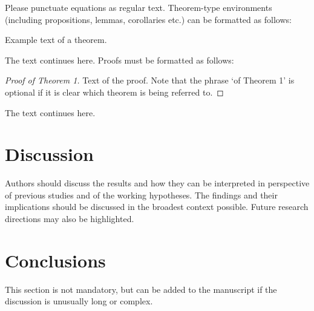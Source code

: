 \documentclass[bioengineering,article,submit,moreauthors,pdftex,10pt,a4paper]{mdpi}
\begin{document}
Please punctuate equations as regular text. Theorem-type environments (including propositions, lemmas, corollaries etc.) can be formatted as follows:
\begin{Theorem}
Example text of a theorem.
\end{Theorem}

The text continues here. Proofs must be formatted as follows:

\begin{proof}[Proof of Theorem 1]
Text of the proof. Note that the phrase `of Theorem 1' is optional if it is clear which theorem is being referred to.
\end{proof}
The text continues here.


\section{Discussion}

Authors should discuss the results and how they can be interpreted in perspective of previous studies and of the working hypotheses. The findings and their implications should be discussed in the broadest context possible. Future research directions may also be highlighted.


\section{Conclusions}

This section is not mandatory, but can be added to the manuscript if the discussion is unusually long or complex.

\vspace{6pt} 





\end{document}

